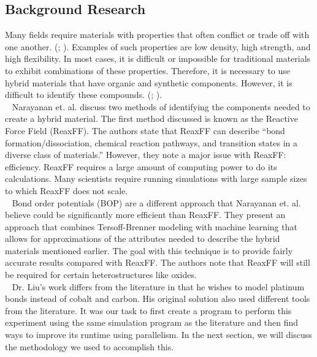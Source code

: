 \documentclass[letterpaper, 12pt]{article}
\begin{document}
\begin{flushleft}

\section*{Background Research}
Many fields require materials with properties that often conflict or trade off with one another. (\cite{Narayanan}; \cite{Ritchie}).  Examples of such properties are low density, high strength, and high flexibility.  In most cases, it is difficult or impossible for traditional materials to exhibit combinations of these properties. Therefore, it is necessary to use hybrid materials that have organic and synthetic components. However, it is difficult to identify these compounds. (\cite{Narayanan}; \cite{Wight}).\\
~\newline
Narayanan et. al. discuss two methods of identifying the components needed to create a hybrid material. The first
method discussed is known as the Reactive Force Field (ReaxFF). The authors state that ReaxFF can describe ``bond formation/dissociation, chemical reaction pathways, and transition states in a diverse class of materials.'' However, they note a major issue with ReaxFF: efficiency. ReaxFF requires a large amount of computing power to do its calculations. Many scientists require running simulations with large sample sizes to which ReaxFF does not scale. \\
~\newline
Bond order potentials (BOP) are a different approach that Narayanan et. al. believe could be significantly more
efficient than ReaxFF. They present an approach that combines Tersoff-Brenner modeling with machine learning that
allows for approximations of the attributes needed to describe the hybrid materials mentioned earlier. The goal
with this technique is to provide fairly accurate results compared with ReaxFF. The authors note that
ReaxFF will still be required for certain heterostructures like oxides. \\
~\newline
Dr. Liu's work differs from the literature in that he wishes to model platinum bonds instead of cobalt and carbon. His original solution also used different tools from the literature. It was our task to first create a program to perform this experiment using the same simulation program as the literature and then find ways to improve its runtime using parallelism. In the next section, we will discuss the methodology we used to accomplish this. 


\end{flushleft}
\end{document}
